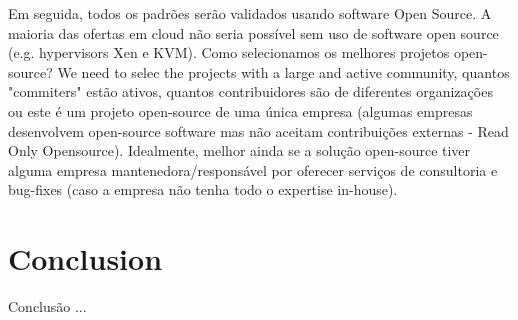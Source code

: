 \documentclass[12pt]{article}
\begin{document}
	Em seguida, todos os padrões serão validados usando software Open Source. A maioria das ofertas em cloud não seria possível sem uso de software open source (e.g. hypervisors Xen e KVM). Como selecionamos os melhores projetos open-source? We need to selec the projects with a large and active community, quantos "commiters" estão ativos, quantos contribuidores são de diferentes organizações ou este é um projeto open-source de uma única empresa (algumas empresas desenvolvem open-source software mas não aceitam contribuições externas - Read Only Opensource). Idealmente, melhor ainda se a solução open-source tiver alguma empresa mantenedora/responsável por oferecer serviços de consultoria e bug-fixes (caso a empresa não tenha todo o expertise in-house). 
	
	\section{Conclusion}
		
	Conclusão ...
	
	
	
	
	
	
	
	
	\cite{Ferrer:2012}
	\cite{Zann_2}
	\cite{Bond:2015}
	\cite{Morris:2016}
	\cite{Fisher:2018}
	
	
	\nocite{Fisher:2018}
	\nocite{Bond:2015}
	
	\newpage
		
	
	
\end{document}
